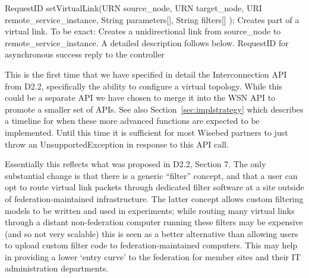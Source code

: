 
\begin{apidoc}
	{RequestID setVirtualLink(URN source\_node, URN target\_node, URI remote\_service\_instance, String parameters[], String filters[] );} %
	{Creates part of a virtual link. To be exact: Creates a unidirectional link from source\_node to remote\_service\_instance. A detailed description follows below.} %
	{
	} %
	{RequestID for asynchronous success reply to the controller} %
	{
		This is the first time that we have specified in detail the Interconnection API from D2.2, specifically the ability to configure a virtual topology. While this could be a separate API we have chosen to merge it into the WSN API to promote a smaller set of APIs. See also Section~\ref{sec:implstrategy} which describes a timeline for when these more advanced functions are expected to be implemented. Until this time it is sufficient for most Wisebed partners to just throw an UnsupportedException in response to this API call.
		
		Essentially this reflects what was proposed in D2.2, Section 7. The only substantial change is that there is a generic ``filter'' concept, and that a user can opt to route virtual link packets through dedicated filter software at a site outside of federation-maintained infrastructure. The latter concept allows custom filtering models to be written and used in experiments; while routing many virtual links through a distant non-federation computer running these filters may be expensive (and so not very scalable) this is seen as a better alternative than allowing users to upload custom filter code to federation-maintained computers. This may help in providing a lower `entry curve' to the federation for member sites and their IT administration departments.
		
}
\end{apidoc}
